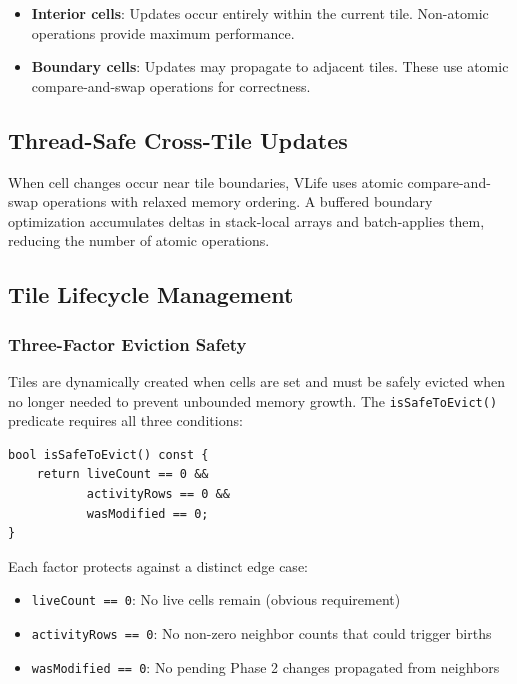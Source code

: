 \documentclass[11pt]{article}
\theoremstyle{definition}
\begin{document}
    \begin{itemize}
        \item \textbf{Interior cells}: Updates occur entirely within the current tile. Non-atomic operations provide maximum performance.
        \item \textbf{Boundary cells}: Updates may propagate to adjacent tiles. These use atomic compare-and-swap operations for correctness.
    \end{itemize}

    \subsection{Thread-Safe Cross-Tile Updates}

    When cell changes occur near tile boundaries, VLife uses atomic compare-and-swap operations with relaxed memory ordering. A buffered boundary optimization accumulates deltas in stack-local arrays and batch-applies them, reducing the number of atomic operations.

    \subsection{Tile Lifecycle Management}

    \subsubsection{Three-Factor Eviction Safety}

    Tiles are dynamically created when cells are set and must be safely evicted when no longer needed to prevent unbounded memory growth. The \texttt{isSafeToEvict()} predicate requires all three conditions:

    \begin{lstlisting}
bool isSafeToEvict() const {
    return liveCount == 0 &&
           activityRows == 0 &&
           wasModified == 0;
}
    \end{lstlisting}

    Each factor protects against a distinct edge case:
    \begin{itemize}
        \item \texttt{liveCount == 0}: No live cells remain (obvious requirement)
        \item \texttt{activityRows == 0}: No non-zero neighbor counts that could trigger births
        \item \texttt{wasModified == 0}: No pending Phase 2 changes propagated from neighbors
    \end{itemize}
\end{document}
